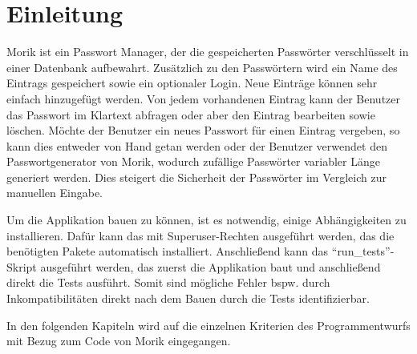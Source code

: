 \chapter{Einleitung}
Morik ist ein Passwort Manager, der die gespeicherten Passwörter verschlüsselt in einer Datenbank aufbewahrt. Zusätzlich zu den Passwörtern wird ein Name des Eintrags gespeichert sowie ein optionaler Login. Neue Einträge können sehr einfach hinzugefügt werden. Von jedem vorhandenen Eintrag kann der Benutzer das Passwort im Klartext abfragen oder aber den Eintrag bearbeiten sowie löschen. Möchte der Benutzer ein neues Passwort für einen Eintrag vergeben, so kann dies entweder von Hand getan werden oder der Benutzer verwendet den Passwortgenerator von Morik, wodurch zufällige Passwörter variabler Länge generiert werden. Dies steigert die Sicherheit der Passwörter im Vergleich zur manuellen Eingabe.

Um die Applikation bauen zu können, ist es notwendig, einige Abhängigkeiten zu installieren. Dafür kann das  mit Superuser-Rechten ausgeführt werden, das die benötigten Pakete automatisch installiert. Anschließend kann das \enquote{run_tests}-Skript ausgeführt werden, das zuerst die Applikation baut und anschließend direkt die Tests ausführt. Somit sind mögliche Fehler bspw. durch Inkompatibilitäten direkt nach dem Bauen durch die Tests identifizierbar.

In den folgenden Kapiteln wird auf die einzelnen Kriterien des Programmentwurfs mit Bezug zum Code von Morik eingegangen.
